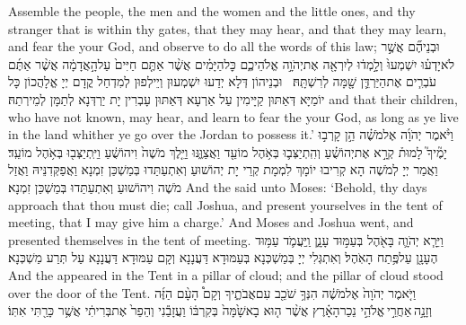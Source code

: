 {Assemble the people, the men and the women and the little ones, and thy stranger that is within thy gates, that they may hear, and that they may learn, and fear the \lord\space your God, and observe to do all the words of this law;}{}
{וּבְנֵיהֶ֞ם אֲשֶׁ֣ר לֹא\maqqaf יָדְע֗וּ יִשְׁמְעוּ֙ וְלָ֣מְד֔וּ לְיִרְאָ֖ה אֶת\maqqaf יְהֹוָ֣ה אֱלֹהֵיכֶ֑ם כׇּל\maqqaf הַיָּמִ֗ים אֲשֶׁ֨ר אַתֶּ֤ם חַיִּים֙ עַל\maqqaf הָ֣אֲדָמָ֔ה אֲשֶׁ֨ר אַתֶּ֜ם עֹבְרִ֧ים אֶת\maqqaf הַיַּרְדֵּ֛ן שָׁ֖מָּה לְרִשְׁתָּֽהּ׃ \petucha }
{וּבְנֵיהוֹן דְּלָא יְדַעוּ יִשְׁמְעוּן וְיֵילְפוּן לְמִדְחַל קֳדָם יְיָ אֱלָהֲכוֹן כָּל יוֹמַיָּא דְּאַתּוּן קַיָּימִין עַל אַרְעָא דְּאַתּוּן עָבְרִין יָת יַרְדְּנָא לְתַמָּן לְמֵירְתַהּ׃}
{and that their children, who have not known, may hear, and learn to fear the \lord\space your God, as long as ye live in the land whither ye go over the Jordan to possess it.’}{}
{וַיֹּ֨אמֶר יְהֹוָ֜ה אֶל\maqqaf מֹשֶׁ֗ה הֵ֣ן קָרְב֣וּ יָמֶ֘יךָ֮ לָמוּת֒ קְרָ֣א אֶת\maqqaf יְהוֹשֻׁ֗עַ וְהִֽתְיַצְּב֛וּ בְּאֹ֥הֶל מוֹעֵ֖ד וַאֲצַוֶּ֑נּוּ וַיֵּ֤לֶךְ מֹשֶׁה֙ וִיהוֹשֻׁ֔עַ וַיִּֽתְיַצְּב֖וּ בְּאֹ֥הֶל מוֹעֵֽד׃}
{וַאֲמַר יְיָ לְמֹשֶׁה הָא קְרִיבוּ יוֹמָךְ לִמְמָת קְרֵי יָת יְהוֹשׁוּעַ וְאִתְעַתַּדוּ בְּמַשְׁכַּן זִמְנָא וַאֲפַקְּדִנֵּיהּ וַאֲזַל מֹשֶׁה וִיהוֹשׁוּעַ וְאִתְעַתַּדוּ בְּמַשְׁכַּן זִמְנָא׃}
{And the \lord\space said unto Moses: ‘Behold, thy days approach that thou must die; call Joshua, and present yourselves in the tent of meeting, that I may give him a charge.’ And Moses and Joshua went, and presented themselves in the tent of meeting.}{}
{וַיֵּרָ֧א יְהֹוָ֛ה בָּאֹ֖הֶל בְּעַמּ֣וּד עָנָ֑ן וַֽיַּעֲמֹ֛ד עַמּ֥וּד הֶעָנָ֖ן עַל\maqqaf פֶּ֥תַח הָאֹֽהֶל׃}
{וְאִתְגְּלִי יְיָ בְּמַשְׁכְּנָא בְּעַמּוּדָא דַּעֲנָנָא וְקָם עַמּוּדָא דַּעֲנָנָא עַל תְּרַע מַשְׁכְּנָא׃}
{And the \lord\space appeared in the Tent in a pillar of cloud; and the pillar of cloud stood over the door of the Tent.}{}
{וַיֹּ֤אמֶר יְהֹוָה֙ אֶל\maqqaf מֹשֶׁ֔ה הִנְּךָ֥ שֹׁכֵ֖ב עִם\maqqaf אֲבֹתֶ֑יךָ וְקָם֩ הָעָ֨ם הַזֶּ֜ה וְזָנָ֣ה \legarmeh  אַחֲרֵ֣י \legarmeh  אֱלֹהֵ֣י נֵכַר\maqqaf הָאָ֗רֶץ אֲשֶׁ֨ר ה֤וּא בָא\maqqaf שָׁ֙מָּה֙ בְּקִרְבּ֔וֹ וַעֲזָבַ֕נִי וְהֵפֵר֙ אֶת\maqqaf בְּרִיתִ֔י אֲשֶׁ֥ר כָּרַ֖תִּי אִתּֽוֹ׃}
